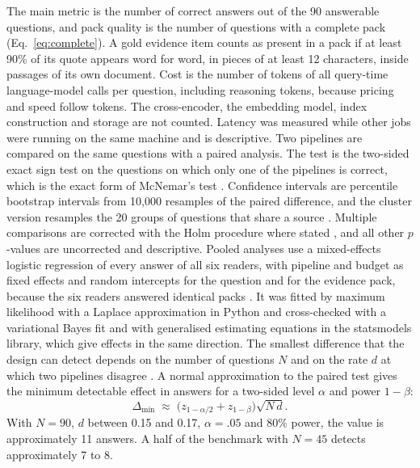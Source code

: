 The main metric is the number of correct answers out of the 90 answerable questions, and pack quality is the number of questions with a complete pack (Eq.~\ref{eq:complete}). A gold evidence item counts as present in a pack if at least 90\% of its quote appears word for word, in pieces of at least 12 characters, inside passages of its own document. Cost is the number of tokens of all query-time language-model calls per question, including reasoning tokens, because pricing and speed follow tokens. The cross-encoder, the embedding model, index construction and storage are not counted. Latency was measured while other jobs were running on the same machine and is descriptive.
Two pipelines are compared on the same questions with a paired analysis. The test is the two-sided exact sign test on the questions on which only one of the pipelines is correct, which is the exact form of McNemar's test \citep{mcnemar1947}. Confidence intervals are percentile bootstrap intervals from 10,000 resamples of the paired difference, and the cluster version resamples the 20 groups of questions that share a source \citep{efron1993bootstrap}. Multiple comparisons are corrected with the Holm procedure where stated \citep{holm1979}, and all other $p$-values are uncorrected and descriptive. Pooled analyses use a mixed-effects logistic regression of every answer of all six readers, with pipeline and budget as fixed effects and random intercepts for the question and for the evidence pack, because the six readers answered identical packs \citep{bates2015lme4}. It was fitted by maximum likelihood with a Laplace approximation in Python and cross-checked with a variational Bayes fit and with generalised estimating equations in the statsmodels library, which give effects in the same direction. The smallest difference that the design can detect depends on the number of questions $N$ and on the rate $d$ at which two pipelines disagree \citep{card2020power,sakai2016topicset}. A normal approximation to the paired test gives the minimum detectable effect in answers for a two-sided level $\alpha$ and power $1-\beta$:
\begin{equation}
\Delta_{\min}\;\approx\;\bigl(z_{1-\alpha/2}+z_{1-\beta}\bigr)\sqrt{N\,d}.
\label{eq:mde}
\end{equation}
With $N=90$, $d$ between 0.15 and 0.17, $\alpha=.05$ and 80\% power, the value is approximately 11 answers. A half of the benchmark with $N=45$ detects approximately 7 to 8.

